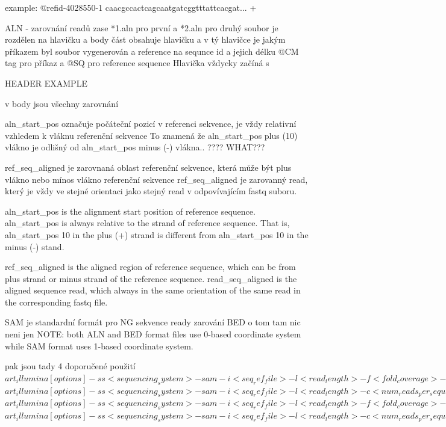 \documentclass[czech,DP]{thesiskiv}
\numberwithin{equation}{section}
\begin{document}
example:
		@refid-4028550-1 
		caacgccactcagcaatgatcggtttattcacgat...
		+ 

ALN - zarovnání readů
zase *1.aln pro první a *2.aln pro druhý
soubor je rozdělen na hlavičku a body část
obsahuje hlavičku a v tý hlavičce je jakým příkazem byl soubor vygenerován a reference na sequnce id a jejich délku
@CM tag pro příkaz a
@SQ pro reference sequence
Hlavička vždycky začíná s 

		HEADER EXAMPLE

		
v body jsou všechny zarovnání 
	    
	    aln\_start\_pos označuje počáteční pozicí v referenci sekvence, je vždy relativní vzhledem k vláknu referenční sekvence
	    To znamená že aln\_start\_pos plus (10) vlákno je odlišný od  aln\_start\_pos minus (-) vlákna.. ???? WHAT???
	    
		ref\_seq\_aligned je zarovnaná oblast referenční sekvence, která může být plus vlákno nebo mínos vlákno referenční sekvence
		ref\_seq\_aligned je zarovanný read, který je vždy ve stejné orientaci jako stejný read v odpovívajícím fastq suboru.  
		
		
			    
	    
	       	
		aln\_start\_pos is the alignment start position of reference sequence. aln\_start\_pos is always relative to the strand of reference sequence. That is, aln\_start\_pos 10 in the plus (+) strand is different from aln\_start\_pos 10 in the minus (‐) stand.  
	
		ref\_seq\_aligned is the aligned region of reference sequence, which can be from plus strand or minus strand of the reference sequence. 
		read\_seq\_aligned is the aligned sequence read, which always in the same orientation of the same read in the corresponding fastq file. 

SAM je standardní formát pro NG sekvence ready zarování
BED o tom tam nic neni jen 
NOTE: both ALN and BED format files use 0-based coordinate system while SAM format uses 1-based coordinate system.

pak jsou tady 4 doporučené použití
$art_illumina [options] -ss <sequencing_system> -sam -i <seq_ref_file> -l <read_length> -f <fold_coverage> -o <outfile_prefix>$
$art_illumina [options] -ss <sequencing_system> -sam -i <seq_ref_file> -l <read_length> -c <num_reads_per_sequence> -o <outfile_prefix>$
$art_illumina [options] -ss <sequencing_system> -sam -i <seq_ref_file> -l <read_length> -f <fold_coverage> -m <mean_fragsize> -s <std_fragsize> -o <outfile_prefix>$
$art_illumina [options] -ss <sequencing_system> -sam -i <seq_ref_file> -l <read_length> -c <num_reads_per_sequence> -m <mean_fragsize> -s <std_fragsize> -o <outfile_prefix>$
\end{document}
